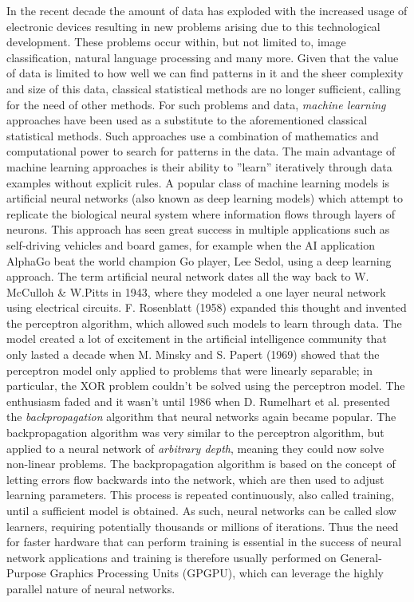 In the recent decade the amount of data has exploded with the increased usage of
electronic devices resulting in new problems arising due to this technological
development.
These problems occur within, but not limited to, image classification, natural
language processing and many more. 
Given that the value of data is limited to how well we can find patterns in it
and the sheer complexity and size of this data, classical statistical methods
are no longer sufficient, calling for the need of other methods. 
For such problems and data, \emph{machine learning} approaches have been used as
a substitute to the aforementioned classical statistical methods. 
Such approaches use a combination of mathematics and computational power to
search for patterns in the data. 
The main advantage of machine learning approaches is their ability to ''learn''
iteratively through data examples without explicit rules.
A popular class of machine learning models is artificial neural networks (also
known as deep learning models) which attempt to replicate the biological neural
system where information flows through layers of neurons. 
This approach has seen great success in multiple applications such as
self-driving vehicles and board games, for example when the AI application
AlphaGo beat the world champion Go player, Lee Sedol, using a deep learning
approach. 
The term artificial neural network dates all the way back to W. McCulloh \&
W.Pitts in 1943, where they modeled a one layer neural network using electrical
circuits. F. Rosenblatt (1958) expanded this thought and invented the perceptron
algorithm, which allowed such models to learn through data. 
The model created a lot of excitement in the artificial intelligence community
that only lasted a decade when M. Minsky and S. Papert (1969) showed that the
perceptron model only applied to problems that were linearly separable; in
particular, the XOR problem couldn't be solved using the perceptron model. 
The enthusiasm faded and it wasn't until 1986 when D. Rumelhart et al. presented
the \emph{backpropagation} algorithm that neural networks again became popular. 
The backpropagation algorithm was very similar to the perceptron algorithm, but
applied to a neural network of \emph{arbitrary depth}, meaning they could now
solve non-linear problems. 
The backpropagation algorithm is based on the concept of letting errors flow
backwards into the network, which are then used to adjust learning parameters. 
This process is repeated continuously, also called training, until a sufficient
model is obtained. 
As such, neural networks can be called slow learners, requiring potentially
thousands or millions of iterations. 
Thus the need for faster hardware that can perform training is essential in the
success of neural network applications and training is therefore usually
performed on General-Purpose Graphics Processing Units (GPGPU), which can
leverage the highly parallel nature of neural networks. \newline 

